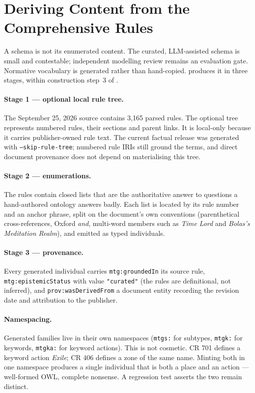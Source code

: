\documentclass[11pt,a4paper]{article}
\begin{document}
\section{Deriving Content from the Comprehensive Rules}
\label{sec:derivation}

A schema is not its enumerated content. The curated, LLM-assisted schema is small and contestable; independent modelling review remains an evaluation gate. Normative vocabulary is generated rather than hand-copied.  produces it in three stages, within construction step~3 of .

\paragraph{Stage 1 --- optional local rule tree.} The September 25, 2026 source contains 3{,}165 parsed rules. The optional tree represents numbered rules, their sections and parent links. It is local-only because it carries publisher-owned rule text. The current factual release was generated with \texttt{--skip-rule-tree}; numbered rule IRIs still ground the terms, and direct document provenance does not depend on materialising this tree.

\paragraph{Stage 2 --- enumerations.} The rules contain closed lists that are the authoritative answer to questions a hand-authored ontology answers badly. Each list is located by its rule number and an anchor phrase, split on the document's own conventions (parenthetical cross-references, Oxford \emph{and}, multi-word members such as \emph{Time Lord} and \emph{Bolas's Meditation Realm}), and emitted as typed individuals.

\paragraph{Stage 3 --- provenance.} Every generated individual carries \texttt{mtg:groundedIn} its source rule, \texttt{mtg:epistemicStatus} with value \texttt{"curated"} (the rules are definitional, not inferred), and \texttt{prov:wasDerivedFrom} a document entity recording the revision date and attribution to the publisher.

\paragraph{Namespacing.} Generated families live in their own namespaces (\texttt{mtgs:} for subtypes, \texttt{mtgk:} for keywords, \texttt{mtgka:} for keyword actions). This is not cosmetic. CR 701 defines a keyword action \emph{Exile}; CR 406 defines a zone of the same name. Minting both in one namespace produces a single individual that is both a place and an action --- well-formed OWL, complete nonsense. A regression test asserts the two remain distinct.
\end{document}
